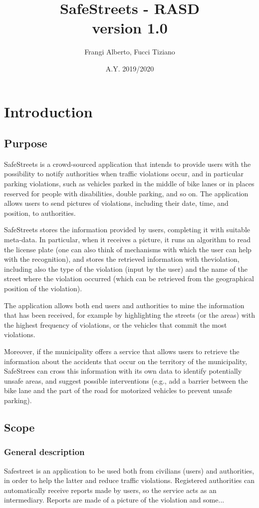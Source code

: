 \documentclass[12pt,a4paper]{report}
\title{SafeStreets - RASD \\ \large version 1.0}
\author{Frangi Alberto, Fucci Tiziano}
\date{A.Y. 2019/2020}
\begin{document}
\maketitle

\tableofcontents
\chapter{Introduction}
	\section{Purpose}
SafeStreets is a crowd-sourced application that intends to provide users with the possibility to notify authorities when traffic violations occur, and in particular parking violations, such as vehicles parked in the middle of bike lanes or in places reserved for people with disabilities, double parking, and so on. The application allows users to send pictures of violations, including their date, time, and position, to authorities.
 
SafeStreets stores the information provided by users, completing it with suitable meta-data. In particular, when it receives a picture, it runs an algorithm to read the license plate (one can also think of mechanisms with which the user can help with the recognition), and stores the retrieved information with theviolation, including also the type of the violation (input by the user) and the name of the street where the violation occurred (which can be retrieved from the geographical position of the violation). 

The application allows both end users and authorities to mine the information that has been received, for example by highlighting the streets (or the areas) with the highest frequency of violations, or the vehicles that commit the most violations. 

Moreover, if the municipality offers a service that allows users to retrieve the information about the accidents that occur on the territory of the municipality, SafeStrees can cross this information with its own data to identify potentially unsafe areas, and suggest possible interventions (e.g., add a barrier between the bike lane and the part of the road for motorized vehicles to prevent unsafe parking).


	\section{Scope}
	\subsection{General description}
Safestreet is an application to be used both from civilians (users) and authorities, in order to help the latter and reduce traffic violations. Registered authorities can automatically receive reports made by users, so the service acts as an intermediary. Reports are made of a picture of the violation and some... 
\end{document}
